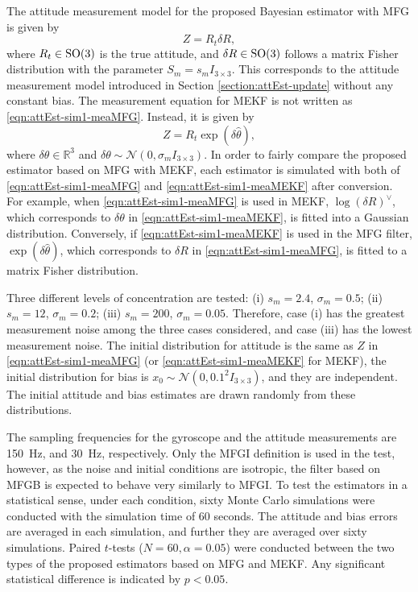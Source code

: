 The attitude measurement model for the proposed Bayesian estimator with MFG is given by
\begin{equation} \label{eqn:attEst-sim1-meaMFG}
	Z = R_t \delta R,
\end{equation}
where $R_t\in\mathrm{SO}(3)$ is the true attitude, and $\delta R\in\mathrm{SO}(3)$ follows a matrix Fisher distribution with the parameter $S_m = s_mI_{3\times 3}$.
This corresponds to the attitude measurement model introduced in Section \ref{section:attEst-update} without any constant bias.
The measurement equation for MEKF is not written as \eqref{eqn:attEst-sim1-meaMFG}. 
Instead, it is given by
\begin{equation} \label{eqn:attEst-sim1-meaMEKF}
	Z = R_t \exp(\delta\hat{\theta}),
\end{equation}
where $\delta\theta \in \mathbb{R}^3$ and $\delta\theta \sim \mathcal{N}(0,\sigma_mI_{3\times 3})$.
In order to fairly compare the proposed estimator based on MFG with MEKF, each estimator is simulated with both of \eqref{eqn:attEst-sim1-meaMFG} and \eqref{eqn:attEst-sim1-meaMEKF} after conversion. 
For example, when \eqref{eqn:attEst-sim1-meaMFG} is used in MEKF, $\log(\delta R)^\vee$, which corresponds to $\delta\theta$ in \eqref{eqn:attEst-sim1-meaMEKF}, is fitted into a Gaussian distribution.
Conversely, if \eqref{eqn:attEst-sim1-meaMEKF} is used in the MFG filter, $\exp(\delta\hat{\theta})$, which corresponds to  $\delta R$ in \eqref{eqn:attEst-sim1-meaMFG}, is fitted to a matrix Fisher distribution.

Three different levels of concentration are tested: (i) $s_m=2.4$, $\sigma_m=0.5$; (ii) $s_m=12$, $\sigma_m=0.2$; (iii) $s_m=200$, $\sigma_m=0.05$.
Therefore, case (i) has the greatest measurement noise among the three cases considered, and case (iii) has the lowest measurement noise. 
The initial distribution for attitude is the same as $Z$ in \eqref{eqn:attEst-sim1-meaMFG} (or \eqref{eqn:attEst-sim1-meaMEKF} for MEKF), the initial distribution for bias is $x_0\sim \mathcal{N}(0,0.1^2I_{3\times3})$, and they are independent.
The initial attitude and bias estimates are drawn randomly from these distributions.

The sampling frequencies for the gyroscope and the attitude measurements are \SI{150}{\hertz}, and \SI{30}{\hertz}, respectively.
Only the MFGI definition is used in the test, however, as the noise and initial conditions are isotropic, the filter based on MFGB is expected to behave very similarly to MFGI.
To test the estimators in a statistical sense, under each condition, sixty Monte Carlo simulations were conducted with the simulation time of 60 seconds.
The attitude and bias errors are averaged in each simulation, and further they are averaged over sixty simulations.
Paired $t$-tests ($N=60,\alpha=0.05$) were conducted between the two types of the proposed estimators based on MFG and MEKF.
Any significant statistical difference is indicated by $p<0.05$.

